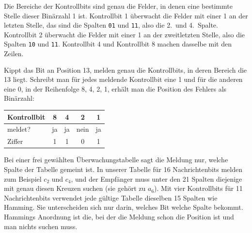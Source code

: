 Die Bereiche der Kontrollbits sind genau die Felder, in denen eine
bestimmte Stelle dieser Binärzahl 1 ist. Kontrollbit 1 überwacht die
Felder mit einer 1 an der letzten Stelle, das sind die Spalten
\texttt{01} und \texttt{11}, also die 2.\ und 4.\ Spalte. Kontrollbit 2
überwacht die Felder mit einer 1 an der zweitletzten Stelle, also die
Spalten \texttt{10} und \texttt{11}. Kontrollbit 4 und Kontrollbit 8
machen dasselbe mit den Zeilen.

Kippt das Bit an Position 13, melden genau die Kontrollbits, in deren
Bereich die 13 liegt. Schreibt man für jedes meldende Kontrollbit eine
1 und für die anderen eine 0, in der Reihenfolge 8, 4, 2, 1, erhält man
die Position des Fehlers als Binärzahl:

\begin{center}
    \begin{tabular}{lcccc}
        Kontrollbit & 8  & 4  & 2    & 1  \\
        \midrule
        meldet?     & ja & ja & nein & ja \\
        Ziffer      & 1  & 1  & 0    & 1  \\
    \end{tabular}
\end{center}

Bei einer frei gewählten Überwachungstabelle sagt die Meldung nur,
welche Spalte der Tabelle gemeint ist. In unserer Tabelle für
16 Nachrichtenbits melden zum Beispiel \(c_2\) und \(c_4\), und der
Empfänger muss unter den 21 Spalten diejenige mit genau diesen Kreuzen
suchen (sie gehört zu \(a_6\)). Mit vier Kontrollbits für
11 Nachrichtenbits verwendet jede gültige Tabelle dieselben 15 Spalten
wie Hamming. Sie unterscheiden sich nur darin, welches Bit welche
Spalte bekommt. Hammings Anordnung ist die, bei der die Meldung schon
die Position ist und man nichts suchen muss.

